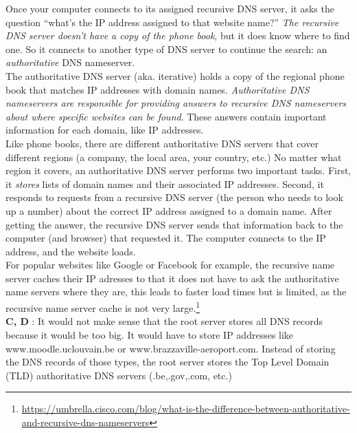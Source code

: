 \documentclass[en]{sourcefiles/eplexam}
\begin{document}
\begin{solution}
\noindent Once your computer connects to its assigned recursive DNS server, it asks the question “what’s the IP address assigned to that website name?”\textit{ The recursive DNS server doesn’t have a copy of the phone book}, but it does know where to find one. So it connects to another type of DNS server to continue the search: an \textit{authoritative} DNS nameserver.\\

\noindent The authoritative DNS server (aka. iterative) holds a copy of the regional phone book that matches IP addresses with domain names. \textit{Authoritative DNS nameservers are responsible for providing answers to recursive DNS nameservers about where specific websites can be found}. These answers contain important information for each domain, like IP addresses.\\

\noindent Like phone books, there are different authoritative DNS servers that cover different regions (a company, the local area, your country, etc.)  No matter what region it covers, an authoritative DNS server performs two important tasks. First, it \textit{stores} lists of domain names and their associated IP addresses. Second, it responds to requests from a recursive DNS server (the person who needs to look up a number) about the correct IP address assigned to a domain name. After getting the answer, the recursive DNS server sends that information back to the computer (and browser) that requested it. The computer connects to the IP address, and the website loads.\\

\noindent For popular websites like Google or Facebook for example, the recursive name server caches their IP adresses to that it does not have to ask the authoritative name servers where they are, this leads to faster load times but is limited, as the recursive name server cache is not very large.\footnote{\url{https://umbrella.cisco.com/blog/what-is-the-difference-between-authoritative-and-recursive-dns-nameservers}}\\

\noindent \textbf{C, D} : It would not make sense that the root server stores all DNS records because it would be too big. It would have to store IP addresses like www.moodle.uclouvain.be or www.brazzaville-aeroport.com. Instead of storing the DNS records of those types, the root server stores the Top Level Domain (TLD) authoritative DNS servers (.be,.gov,.com, etc.)\\



\end{solution}
\end{document}
